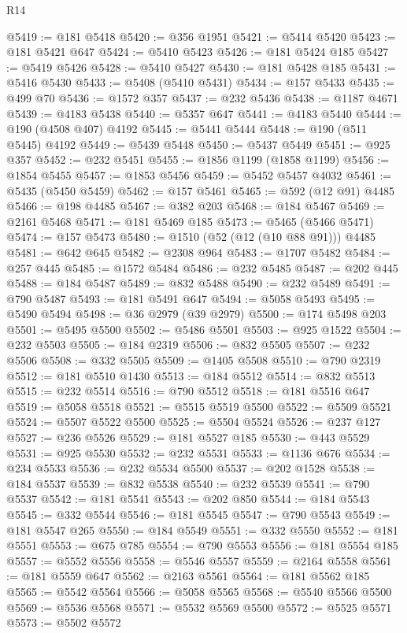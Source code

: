 \begin{lexlean}{R14}
\begin{coremodule}
@5419 := @181 @5418
@5420 := @356 @1951
@5421 := @5414 @5420
@5423 := @181 @5421 @647
@5424 := @5410 @5423
@5426 := @181 @5424 @185
@5427 := @5419 @5426
@5428 := @5410 @5427
@5430 := @181 @5428 @185
@5431 := @5416 @5430
@5433 := @5408 (@5410 @5431)
@5434 := @157 @5433
@5435 := @499 @70
@5436 := @1572 @357
@5437 := @232 @5436
@5438 := @1187 @4671
@5439 := @4183 @5438
@5440 := @5357 @647
@5441 := @4183 @5440
@5444 := @190 (@4508 @407) @4192
@5445 := @5441 @5444
@5448 := @190 (@511 @5445) @4192
@5449 := @5439 @5448
@5450 := @5437 @5449
@5451 := @925 @357
@5452 := @232 @5451
@5455 := @1856 @1199 (@1858 @1199)
@5456 := @1854 @5455
@5457 := @1853 @5456
@5459 := @5452 @5457 @4032
@5461 := @5435 (@5450 @5459)
@5462 := @157 @5461
@5465 := @592 (@12 @91) @4485
@5466 := @198 @4485
@5467 := @382 @203
@5468 := @184 @5467
@5469 := @2161 @5468
@5471 := @181 @5469 @185
@5473 := @5465 (@5466 @5471)
@5474 := @157 @5473
@5480 := @1510 (@52 (@12 (@10 @88 @91))) @4485
@5481 := @642 @645
@5482 := @2308 @964
@5483 := @1707 @5482
@5484 := @257 @445
@5485 := @1572 @5484
@5486 := @232 @5485
@5487 := @202 @445
@5488 := @184 @5487
@5489 := @832 @5488
@5490 := @232 @5489
@5491 := @790 @5487
@5493 := @181 @5491 @647
@5494 := @5058 @5493
@5495 := @5490 @5494
@5498 := @36 @2979 (@39 @2979)
@5500 := @174 @5498 @203
@5501 := @5495 @5500
@5502 := @5486 @5501
@5503 := @925 @1522
@5504 := @232 @5503
@5505 := @184 @2319
@5506 := @832 @5505
@5507 := @232 @5506
@5508 := @332 @5505
@5509 := @1405 @5508
@5510 := @790 @2319
@5512 := @181 @5510 @1430
@5513 := @184 @5512
@5514 := @832 @5513
@5515 := @232 @5514
@5516 := @790 @5512
@5518 := @181 @5516 @647
@5519 := @5058 @5518
@5521 := @5515 @5519 @5500
@5522 := @5509 @5521
@5524 := @5507 @5522 @5500
@5525 := @5504 @5524
@5526 := @237 @127
@5527 := @236 @5526
@5529 := @181 @5527 @185
@5530 := @443 @5529
@5531 := @925 @5530
@5532 := @232 @5531
@5533 := @1136 @676
@5534 := @234 @5533
@5536 := @232 @5534 @5500
@5537 := @202 @1528
@5538 := @184 @5537
@5539 := @832 @5538
@5540 := @232 @5539
@5541 := @790 @5537
@5542 := @181 @5541
@5543 := @202 @850
@5544 := @184 @5543
@5545 := @332 @5544
@5546 := @181 @5545
@5547 := @790 @5543
@5549 := @181 @5547 @265
@5550 := @184 @5549
@5551 := @332 @5550
@5552 := @181 @5551
@5553 := @675 @785
@5554 := @790 @5553
@5556 := @181 @5554 @185
@5557 := @5552 @5556
@5558 := @5546 @5557
@5559 := @2164 @5558
@5561 := @181 @5559 @647
@5562 := @2163 @5561
@5564 := @181 @5562 @185
@5565 := @5542 @5564
@5566 := @5058 @5565
@5568 := @5540 @5566 @5500
@5569 := @5536 @5568
@5571 := @5532 @5569 @5500
@5572 := @5525 @5571
@5573 := @5502 @5572

\end{coremodule}
\end{lexlean}
